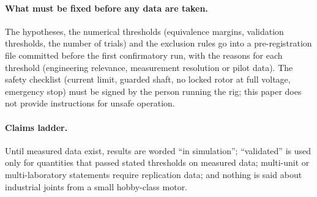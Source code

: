 \paragraph*{What must be fixed before any data are taken.} The hypotheses, the numerical thresholds (equivalence margins, validation thresholds, the number of trials) and the exclusion rules go into a pre-registration file committed before the first confirmatory run, with the reasons for each threshold (engineering relevance, measurement resolution or pilot data). The safety checklist (current limit, guarded shaft, no locked rotor at full voltage, emergency stop) must be signed by the person running the rig; this paper does not provide instructions for unsafe operation.

\paragraph*{Claims ladder.} Until measured data exist, results are worded ``in simulation''; ``validated'' is used only for quantities that passed stated thresholds on measured data; multi-unit or multi-laboratory statements require replication data; and nothing is said about industrial joints from a small hobby-class motor.
